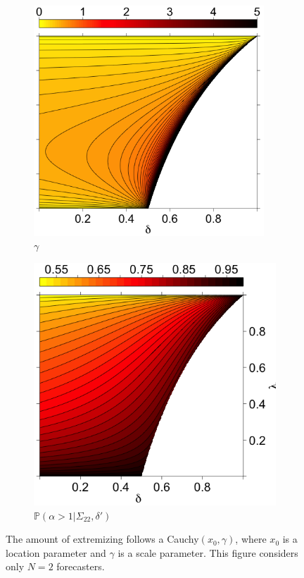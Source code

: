 \documentclass[11pt]{article}
\renewcommand{\P}{\mathbb{P}}
\theoremstyle{definition}
\theoremstyle{definition}
\def\P{{\mathbb P}}
\begin{document}
\begin{figure}[t]
\begin{subfigure}[b]{0.33\textwidth}
        \includegraphics[width= 0.95\textwidth, height = \textwidth]{ExtremeGamma}
\caption{$\gamma$}
\label{gammaOracle}
        \end{subfigure}
\hspace{-1.3em}
    \begin{subfigure}[b]{0.33\textwidth}
        \includegraphics[width=1.07\textwidth, height = \textwidth]{Probs}
\caption{$\P(\alpha > 1 | \Sigma_{22}, \delta')$}
\label{probOracle}
        \end{subfigure}

    \caption{ The amount of extremizing follows a 
Cauchy$(x_0, \gamma)$, where $x_0$ is a location parameter and $\gamma$ 
is a scale parameter.  This figure considers only $N = 2$ forecasters.}
        \label{LevelplotsOracle}
\end{figure}
 
\end{document}
